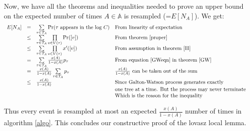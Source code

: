 Now, we have all the theorems and inequalities needed to prove an upper bound on the expected number of times $A\in\mathbb{A}$ is resampled (=$E[N_A]$). We get:
\[
 \begin{array}{rcll}
  E[N_A] & = & \sum\limits_{\tau\in\mathcal{T}_A} \Pr(\tau\text{ appears in the log }C) & \text{From linearity of expectation}\\
  & \leq & \sum\limits_{\tau\in\mathcal{T}_A}\prod\limits_{v\in V(\tau) } \Pr([v]) & \text{From theorem \ref{proper}} \\
  & \leq & \sum\limits_{\tau\in\mathcal{T}_A}\prod\limits_{v\in V(\tau) }x'([v]) & \text{From assumption in theorem \ref{lll}} \\
  & = & \sum\limits_{\tau\in\mathcal{T}_A} \frac{x(A)}{1-x(A) }p_\tau & \text{From equation \ref{GWeqn} in theorem \ref{GW}} \\
  & = & \frac{x(A)}{1-x(A) } \sum\limits_{\tau\in\mathcal{T}_A}p_\tau & \frac{x(A)}{1-x(A)} \text{ can be taken out of the sum} \\
  & \leq & \frac{x(A)}{1-x(A) } & \text{Since Galton-Watson process generates exactly}\\
  & & & \text{one tree at a time. But the process may never terminate}\\
  & & & \text{Which is the reason for the inequality}
 \end{array}
\]

Thus every event is resampled at most an expected $\frac{x(A)}{1-x(A) } $ number of times in algorithm \ref{algo}. This concludes our constructive proof of the lovasz local lemma.